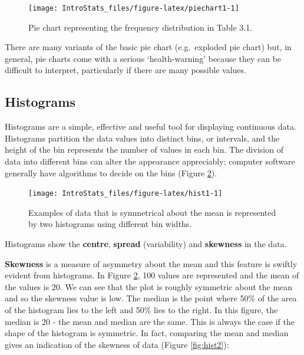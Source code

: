 \documentclass[
  oneside]{krantz}
\begin{document}
\begin{figure}

{\centering \texttt{[image: IntroStats\_files/figure-latex/piechart1-1]} 

}

\caption{Pie chart representing the frequency distribution in Table 3.1.}\label{fig:piechart1}
\end{figure}

There are many variants of the basic pie chart (e.g.~exploded pie chart) but, in general, pie charts come with a serious `health-warning' because they can be difficult to interpret, particularly if there are many possible values.

\hypertarget{histograms}{%
\subsection{Histograms}\label{histograms}}

Histograms are a simple, effective and useful tool for displaying continuous data. Histograms partition the data values into distinct bins, or intervals, and the height of the bin represents the number of values in each bin. The division of data into different bins can alter the appearance appreciably; computer software generally have algorithms to decide on the bins (Figure \ref{fig:hist1}).

\begin{figure}

{\centering \texttt{[image: IntroStats\_files/figure-latex/hist1-1]} 

}

\caption{Examples of data that is symmetrical about the mean is represented by two histograms using different bin widths.}\label{fig:hist1}
\end{figure}

Histograms show the \textbf{centre}, \textbf{spread} (variability) and \textbf{skewness} in the data.

\textbf{Skewness} is a measure of asymmetry about the mean and this feature is swiftly evident from histograms. In Figure \ref{fig:hist1}, 100 values are represented and the mean of the values is 20. We can see that the plot is roughly symmetric about the mean and so the skewness value is low. The median is the point where 50\% of the area of the histogram lies to the left and 50\% lies to the right. In this figure, the median is 20 - the mean and median are the same. This is always the case if the shape of the histogram is symmetric. In fact, comparing the mean and median gives an indication of the skewness of data (Figure \ref{fig:hist2}):
\end{document}
